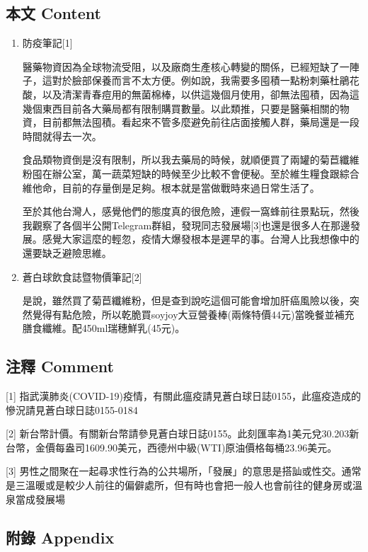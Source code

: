 \documentclass[a5paper, 12pt
]{book}
\begin{document}
\hypertarget{ux672cux6587-content-33}{%
\subsection{本文 Content}\label{ux672cux6587-content-33}}

\begin{enumerate}
\def\labelenumi{\arabic{enumi}.}
\item
  防疫筆記{[}1{]}

  醫藥物資因為全球物流受阻，以及廠商生產核心轉變的關係，已經短缺了一陣子，這對於臉部保養而言不太方便。例如說，我需要多囤積一點粉刺藥杜鵑花酸，以及清潔青春痘用的無菌棉棒，以供這幾個月使用，卻無法囤積，因為這幾個東西目前各大藥局都有限制購買數量。以此類推，只要是醫藥相關的物資，目前都無法囤積。看起來不管多麼避免前往店面接觸人群，藥局還是一段時間就得去一次。

  食品類物資倒是沒有限制，所以我去藥局的時候，就順便買了兩罐的菊苣纖維粉囤在辦公室，萬一蔬菜短缺的時候至少比較不會便秘。至於維生糧食跟綜合維他命，目前的存量倒是足夠。根本就是當做戰時來過日常生活了。

  至於其他台灣人，感覺他們的態度真的很危險，連假一窩蜂前往景點玩，然後我觀察了各個半公開Telegram群組，發現同志發展場{[}3{]}也還是很多人在那邊發展。感覺大家這麼的輕忽，疫情大爆發根本是遲早的事。台灣人比我想像中的還要缺乏避險思維。
\item
  蒼白球飲食誌暨物價筆記{[}2{]}

  是說，雖然買了菊苣纖維粉，但是查到說吃這個可能會增加肝癌風險以後，突然覺得有點危險，所以乾脆買soyjoy大豆營養棒(兩條特價44元)當晚餐並補充膳食纖維。配450ml瑞穗鮮乳(45元)。
\end{enumerate}

\hypertarget{ux6ce8ux91cb-comment-33}{%
\subsection{注釋 Comment}\label{ux6ce8ux91cb-comment-33}}

{[}1{]}
指武漢肺炎(COVID-19)疫情，有關此瘟疫請見蒼白球日誌0155，此瘟疫造成的慘況請見蒼白球日誌0155-0184

{[}2{]}
新台幣計價。有關新台幣請參見蒼白球日誌0155。此刻匯率為1美元兌30.203新台幣，金價每盎司1609.90美元，西德州中級(WTI)原油價格每桶23.96美元。

{[}3{]}
男性之間聚在一起尋求性行為的公共場所，「發展」的意思是搭訕或性交。通常是三溫暖或是較少人前往的偏僻處所，但有時也會把一般人也會前往的健身房或溫泉當成發展場

\hypertarget{ux9644ux9304-appendix-33}{%
\subsection{附錄 Appendix}\label{ux9644ux9304-appendix-33}}
\end{document}
